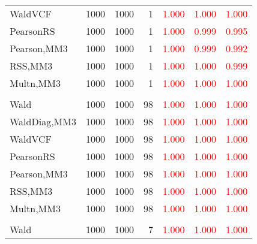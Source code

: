 \documentclass[
]{article}
\begin{document}
\begin{table}[H]
{\begin{tabular}[t]{lrrrrrr}
\hspace{1em}WaldVCF & 1000 & 1000 & 1 & \textcolor{red}{1.000} & \textcolor{red}{1.000} & \textcolor{red}{1.000}\\
\hspace{1em}PearsonRS & 1000 & 1000 & 1 & \textcolor{red}{1.000} & \textcolor{red}{0.999} & \textcolor{red}{0.995}\\
\hspace{1em}Pearson,MM3 & 1000 & 1000 & 1 & \textcolor{red}{1.000} & \textcolor{red}{0.999} & \textcolor{red}{0.992}\\
\hspace{1em}RSS,MM3 & 1000 & 1000 & 1 & \textcolor{red}{1.000} & \textcolor{red}{1.000} & \textcolor{red}{0.999}\\
\hspace{1em}Multn,MM3 & 1000 & 1000 & 1 & \textcolor{red}{1.000} & \textcolor{red}{1.000} & \textcolor{red}{1.000}\\
\addlinespace[0.3em]
\multicolumn{7}{l}{\textbf{1F 15V}}\\
\hspace{1em}Wald & 1000 & 1000 & 98 & \textcolor{red}{1.000} & \textcolor{red}{1.000} & \textcolor{red}{1.000}\\
\hspace{1em}WaldDiag,MM3 & 1000 & 1000 & 98 & \textcolor{red}{1.000} & \textcolor{red}{1.000} & \textcolor{red}{1.000}\\
\hspace{1em}WaldVCF & 1000 & 1000 & 98 & \textcolor{red}{1.000} & \textcolor{red}{1.000} & \textcolor{red}{1.000}\\
\hspace{1em}PearsonRS & 1000 & 1000 & 98 & \textcolor{red}{1.000} & \textcolor{red}{1.000} & \textcolor{red}{1.000}\\
\hspace{1em}Pearson,MM3 & 1000 & 1000 & 98 & \textcolor{red}{1.000} & \textcolor{red}{1.000} & \textcolor{red}{1.000}\\
\hspace{1em}RSS,MM3 & 1000 & 1000 & 98 & \textcolor{red}{1.000} & \textcolor{red}{1.000} & \textcolor{red}{1.000}\\
\hspace{1em}Multn,MM3 & 1000 & 1000 & 98 & \textcolor{red}{1.000} & \textcolor{red}{1.000} & \textcolor{red}{1.000}\\
\addlinespace[0.3em]
\multicolumn{7}{l}{\textbf{2F 10V}}\\
\hspace{1em}Wald & 1000 & 1000 & 7 & \textcolor{red}{1.000} & \textcolor{red}{1.000} & \textcolor{red}{1.000}\\

\end{tabular}}
\end{table}
\end{document}
